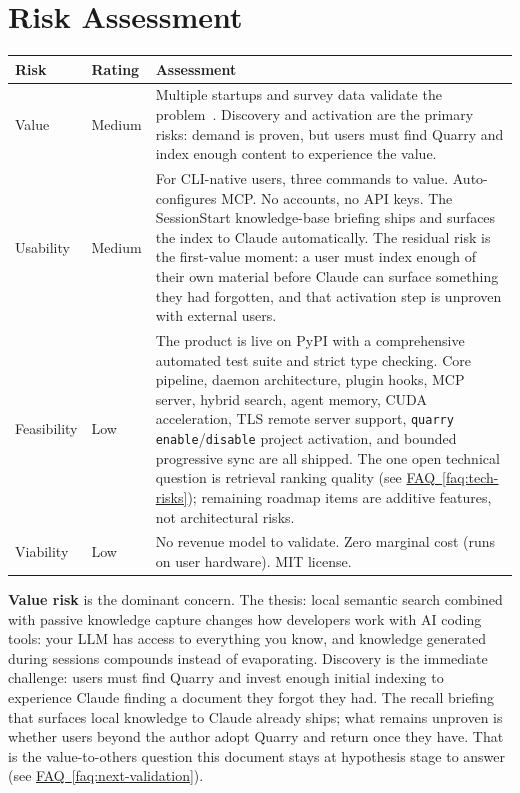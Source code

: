 \documentclass[11pt,letterpaper]{article}
\newcommand{\faqref}[1]{\hyperref[#1]{FAQ~\ref*{#1}}}
\begin{document}

\newpage
\section*{Risk Assessment}

\renewcommand{\arraystretch}{1.6}
\begin{tabularx}{\textwidth}{@{} l l X @{}}
\toprule
\textbf{\color{SectionBlue}Risk} & \textbf{\color{SectionBlue}Rating} & \textbf{\color{SectionBlue}Assessment} \\
\midrule
Value      & \textcolor{RiskAmber}{Medium} & Multiple startups and survey data validate the problem~\cite{qodo2025aicodequality,techcrunch2026entirefunding}. Discovery and activation are the primary risks: demand is proven, but users must find Quarry and index enough content to experience the value. \\
Usability  & \textcolor{RiskAmber}{Medium} & For CLI-native users, three commands to value. Auto-configures MCP. No accounts, no API keys. The SessionStart knowledge-base briefing ships and surfaces the index to Claude automatically. The residual risk is the first-value moment: a user must index enough of their own material before Claude can surface something they had forgotten, and that activation step is unproven with external users. \\
Feasibility & \textcolor{RiskGreen}{Low} & The product is live on PyPI with a comprehensive automated test suite and strict type checking. Core pipeline, daemon architecture, plugin hooks, MCP server, hybrid search, agent memory, CUDA acceleration, TLS remote server support, \texttt{quarry enable}/\texttt{disable} project activation, and bounded progressive sync are all shipped. The one open technical question is retrieval ranking quality (see \faqref{faq:tech-risks}); remaining roadmap items are additive features, not architectural risks. \\
Viability  & \textcolor{RiskGreen}{Low} & No revenue model to validate. Zero marginal cost (runs on user hardware). MIT license. \\
\bottomrule
\end{tabularx}
\renewcommand{\arraystretch}{1.0}

\vspace{1em}

\textbf{Value risk} is the dominant concern. The thesis: local semantic search
combined with passive knowledge capture changes how developers work with AI
coding tools: your LLM has access to everything you know, and knowledge
generated during sessions compounds instead of evaporating. Discovery is the
immediate challenge: users must find Quarry and invest enough initial indexing
to experience Claude finding a document they forgot they had. The recall
briefing that surfaces local knowledge to Claude already ships; what remains
unproven is whether users beyond the author adopt Quarry and return once they
have. That is the value-to-others question this document stays at hypothesis
stage to answer (see \faqref{faq:next-validation}).
\end{document}
